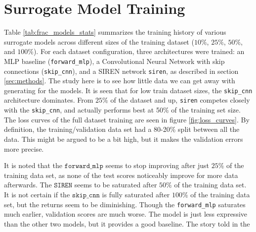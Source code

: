 \section{Surrogate Model Training}
Table \ref{tab:frac_models_stats} summarizes the training history of various surrogate models across different sizes of the training dataset ($10\%$, $25\%$, $50\%$, and $100\%$). For each dataset configuration, three architectures were trained: an MLP baseline (\texttt{forward\_mlp}), a Convolutional Neural Network with skip connections (\texttt{skip\_cnn}), and a SIREN network \texttt{siren}, as described in section \ref{sec:methods}.
The study here is to see how little data we can get away with generating for the models. It is seen that for low train dataset sizes, the \texttt{skip\_cnn} architecture dominates. From $25\%$ of the dataset and up, \texttt{siren} competes closely with the \texttt{skip\_cnn}, and actually performs best at 50\% of the training set size.
The loss curves of the full dataset training are seen in figure \ref{fig:loss_curves}. By definition, the training/validation data set had a 80-20\% split between all the data. This might be argued to be a bit high, but it makes the validation errors more precise.

\begin{table}[htbp]
    \centering
    
    \caption{Global statistics for surrogate models trained on fractional subsets of the Si-TiO$_2$-Si$_3$N$_4$ dataset. Mean Absolute Error (MAE), Maximum Absolute Error, and $R^2$ are evaluated on the full test dataset. Bolded entries are the best for the row.}
    \label{tab:frac_models_stats}
\end{table}

It is noted that the $\texttt{forward\_mlp}$ seems to stop improving after just $25\%$ of the training data set, as none of the test scores noticeably improve for more data afterwards.
The $\texttt{SIREN}$ seems to be saturated after $50\%$ of the training data set. It is not certain if the $\texttt{skip\_cnn}$ is fully saturated after $100\%$ of the training data set, but the returns seem to be diminishing. Though the \texttt{forward\_mlp} saturates much earlier, validation scores are much worse. The model is just less expressive than the other two models, but it provides a good baseline.
The story told in the 

